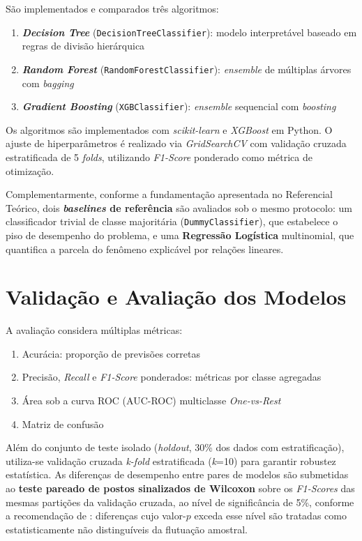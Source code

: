São implementados e comparados três algoritmos:

\begin{enumerate}
    \item \textbf{\textit{Decision Tree}} (\texttt{DecisionTreeClassifier}): modelo interpretável baseado em regras de divisão hierárquica
    \item \textbf{\textit{Random Forest}} (\texttt{RandomForestClassifier}): \textit{ensemble} de múltiplas árvores com \textit{bagging}
    \item \textbf{\textit{Gradient Boosting}} (\texttt{XGBClassifier}): \textit{ensemble} sequencial com \textit{boosting}
\end{enumerate}

Os algoritmos são implementados com \textit{scikit-learn} e \textit{XGBoost} em Python. O ajuste de hiperparâmetros é realizado via \textit{GridSearchCV} com validação cruzada estratificada de 5 \textit{folds}, utilizando \textit{F1-Score} ponderado como métrica de otimização.

Complementarmente, conforme a fundamentação apresentada no Referencial Teórico, dois \textbf{\textit{baselines} de referência} são avaliados sob o mesmo protocolo: um classificador trivial de classe majoritária (\texttt{DummyClassifier}), que estabelece o piso de desempenho do problema, e uma \textbf{Regressão Logística} multinomial, que quantifica a parcela do fenômeno explicável por relações lineares.

\section{Validação e Avaliação dos Modelos}

A avaliação considera múltiplas métricas:

\begin{enumerate}
    \item Acurácia: proporção de previsões corretas
    \item Precisão, \textit{Recall} e \textit{F1-Score} ponderados: métricas por classe agregadas
    \item Área sob a curva ROC (AUC-ROC) multiclasse \textit{One-vs-Rest}
    \item Matriz de confusão
\end{enumerate}

Além do conjunto de teste isolado (\textit{holdout}, 30\% dos dados com estratificação), utiliza-se validação cruzada \textit{k-fold} estratificada (\textit{k}=10) para garantir robustez estatística. As diferenças de desempenho entre pares de modelos são submetidas ao \textbf{teste pareado de postos sinalizados de Wilcoxon} sobre os \textit{F1-Scores} das mesmas partições da validação cruzada, ao nível de significância de 5\%, conforme a recomendação de : diferenças cujo valor-$p$ exceda esse nível são tratadas como estatisticamente não distinguíveis da flutuação amostral.

